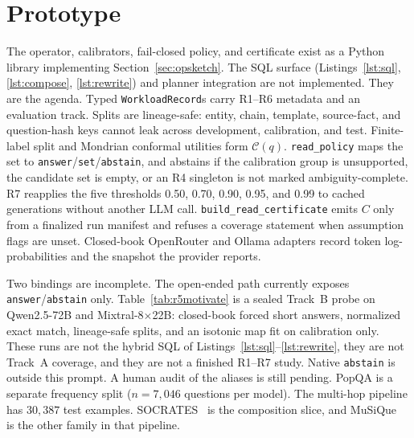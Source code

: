 \documentclass[sigconf, nonacm]{acmart}
\newcommand{\cbras}{\texttt{answer}/\allowbreak\texttt{set}/\allowbreak\texttt{abstain}}
\newcommand{\cbraa}{\texttt{answer}/\allowbreak\texttt{abstain}}
\newcommand{\cbrth}{0.50, 0.70, 0.90, 0.95, and 0.99}
\begin{document}
\section{Prototype}
\label{sec:proto}

The operator, calibrators, fail-closed policy, and certificate exist as a Python library implementing Section~\ref{sec:opsketch}. The SQL surface (Listings~\ref{lst:sql}, \ref{lst:compose}, \ref{lst:rewrite}) and planner integration are not implemented. They are the agenda. Typed \texttt{WorkloadRecord}s carry R1--R6 metadata and an evaluation track. Splits are lineage-safe: entity, chain, template, source-fact, and question-hash keys cannot leak across development, calibration, and test. Finite-label split and Mondrian conformal utilities form $\mathcal{C}(q)$. \texttt{read\_policy} maps the set to \cbras{}, and abstains if the calibration group is unsupported, the candidate set is empty, or an R4 singleton is not marked ambiguity-complete. R7 reapplies the five thresholds \cbrth{} to cached generations without another LLM call. \texttt{build\_read\allowbreak\_certificate} emits $C$ only from a finalized run manifest and refuses a coverage statement when assumption flags are unset. Closed-book OpenRouter and Ollama adapters record token log-probabilities and the snapshot the provider reports.

Two bindings are incomplete. The open-ended path currently exposes \cbraa{} only. Table~\ref{tab:r5motivate} is a sealed Track~B probe on Qwen2.5-72B and Mixtral-8$\times$22B: closed-book forced short answers, normalized exact match, lineage-safe splits, and an isotonic map fit on calibration only. These runs are not the hybrid SQL of Listings~\ref{lst:sql}--\ref{lst:rewrite}, they are not Track~A coverage, and they are not a finished R1--R7 study. Native \texttt{abstain} is outside this prompt. A human audit of the aliases is still pending. PopQA is a separate frequency split ($n{=}7{,}046$ questions per model). The multi-hop pipeline has $30{,}387$ test examples. SOCRATES~\cite{yang2024socrates} is the composition slice, and MuSiQue~\cite{trivedi2022musique} is the other family in that pipeline.
\end{document}
